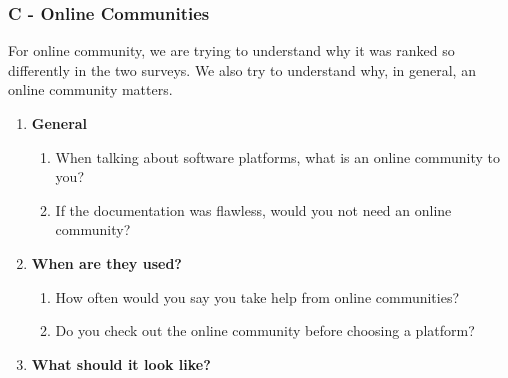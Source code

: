 \documentclass{cslthse-msc}
\begin{document}
    \subsubsection{C - Online Communities}
    For online community, we are trying to understand why it was ranked
    so differently in the two surveys. We also try to understand why, in general,
    an online community matters.

    \begin{enumerate}[label=C\Alph*]
        \item \textbf{General}
        \begin{enumerate}[label={CA\arabic*}]
            \item	When talking about software platforms, what is an online community to you?
            \item	If the documentation was flawless, would you not need an online community?
        \end{enumerate}
        \item \textbf{When are they used?}
        \begin{enumerate}[label={CB\arabic*}]
            \item	How often would you say you take help from online communities?
            \item   Do you check out the online community before choosing a platform?
        \end{enumerate}
        \item \textbf{What should it look like?}


\end{enumerate}
\end{document}
